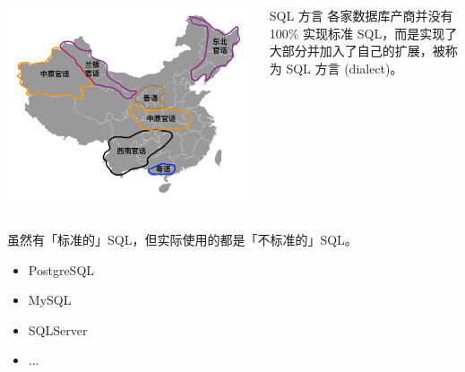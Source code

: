 \documentclass[aspectratio=169, 14pt]{beamer}
\begin{document}
\begin{frame}

\begin{columns}
    \includegraphics[width=\textwidth]{week3/china}
    \begin{block}{SQL 方言}
        各家数据库产商并没有 100\% 实现标准 SQL，而是实现了大部分并加入了自己的扩展，被称为 \alert{SQL 方言} (dialect)。   
    \end{block}
\end{columns}

虽然有「标准的」SQL，但实际使用的都是「不标准的」SQL。

\begin{itemize}
    \item PostgreSQL
    \item MySQL
    \item SQLServer
    \item ...
\end{itemize}
\end{frame}
\end{document}
